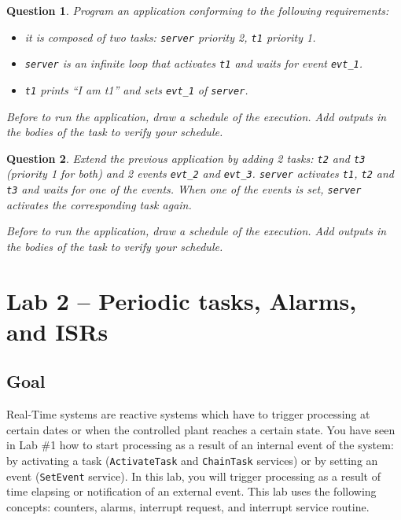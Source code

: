 \documentclass[11pt]{report}
\newtheorem{ex}{Question}
\begin{document}
\begin{ex}
  Program an application conforming to the following requirements:

  \begin{itemize}
    \item it is composed of two tasks: \texttt{server} priority 2, \texttt{t1} priority 1.
    \item \texttt{server} is an infinite loop that activates \texttt{t1} and waits for event \texttt{evt\_1}.
    \item \texttt{t1} prints ``I am t1'' and sets \texttt{evt\_1} of \texttt{server}.
  \end{itemize}

  Before to run the application, draw a schedule of the execution. Add outputs in the bodies of the task to verify your schedule.
\end{ex}

\begin{ex}
  Extend the previous application by adding 2 tasks: \texttt{t2} and \texttt{t3} (priority 1 for both) and 2 events \texttt{evt\_2} and \texttt{evt\_3}. \texttt{server} activates \texttt{t1}, \texttt{t2} and \texttt{t3} and waits for one of the events. When one of the events is set, \texttt{server} activates the corresponding task again.

  Before to run the application, draw a schedule of the execution. Add outputs in the bodies of the task to verify your schedule.
\end{ex}

\chapter{Lab 2 -- Periodic tasks, Alarms, and ISRs}

\section{Goal}

Real-Time systems are reactive systems which have to trigger processing at certain dates or when the controlled plant reaches a certain state.
You have seen in Lab \#1 how to start processing as a result of an internal event of the system: by activating a task (\texttt{ActivateTask} and \texttt{ChainTask} services) or by setting an event (\texttt{SetEvent} service).
In this lab, you will trigger processing as a result of time elapsing or notification of an external event.
This lab uses the following concepts: counters, alarms, interrupt request, and interrupt service routine.
\end{document}
